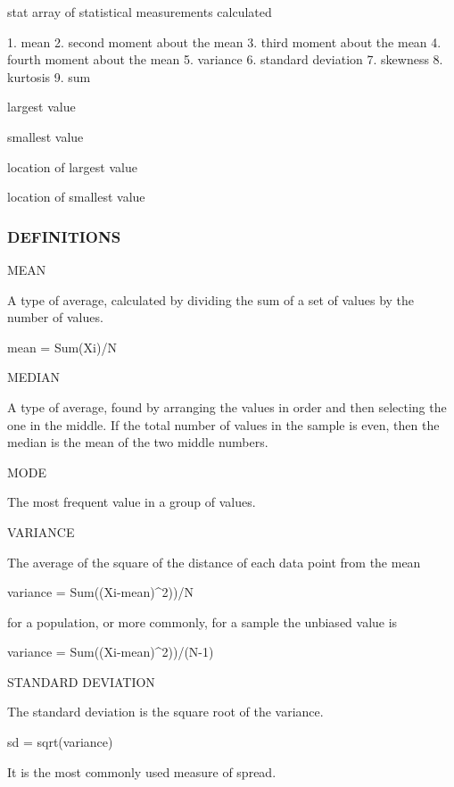 stat array of statistical measurements calculated \begin{DoxyVerb}1.  mean
2.  second moment about the mean
3.  third moment about the mean
4.  fourth moment about the mean
5.  variance
6.  standard deviation
7.  skewness
8.  kurtosis
9.  sum
\end{DoxyVerb}

\begin{DoxyEnumerate}
\item largest value
\item smallest value
\item location of largest value
\item location of smallest value
\end{DoxyEnumerate}

\subsubsection*{D\+E\+F\+I\+N\+I\+T\+I\+O\+NS}

M\+E\+AN \begin{DoxyVerb}   A type of average, calculated by dividing the sum of
   a set of values by the number of values.

      mean = Sum(Xi)/N
\end{DoxyVerb}


M\+E\+D\+I\+AN \begin{DoxyVerb}   A type of average, found by arranging the values in
   order and then selecting the one in the middle. If the
   total number of values in the sample is even, then the
   median is the mean of the two middle numbers.
\end{DoxyVerb}


M\+O\+DE \begin{DoxyVerb}   The most frequent value in a group of values.
\end{DoxyVerb}


V\+A\+R\+I\+A\+N\+CE \begin{DoxyVerb}   The average of the square of the distance of each
   data point from the mean

      variance = Sum((Xi-mean)^2))/N

   for a population, or more commonly, for a sample the
   unbiased value is

      variance = Sum((Xi-mean)^2))/(N-1)
\end{DoxyVerb}


S\+T\+A\+N\+D\+A\+RD D\+E\+V\+I\+A\+T\+I\+ON \begin{DoxyVerb}   The standard deviation is the square root of the
   variance.

      sd = sqrt(variance)

   It is the most commonly used measure of spread.
\end{DoxyVerb}


